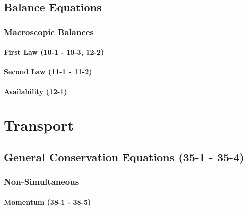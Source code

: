 \documentclass{mitqualif}
\begin{document}
\section{Balance Equations}
\subsection{Macroscopic Balances}
\subsubsection{First Law (10-1 - 10-3, 12-2)}




\subsubsection{Second Law (11-1 - 11-2)}


\subsubsection{Availability (12-1)}

\newpage
\chapter{Transport}
\section{General Conservation Equations (35-1 - 35-4)}





\subsection{Non-Simultaneous}
\subsubsection{Momentum (38-1 - 38-5)}




















%

















\end{document}
